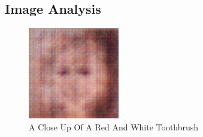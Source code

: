 \documentclass{article}%
\begin{document}
%
\subsection{Image Analysis}%
\label{subsec:ImageAnalysis}%


\begin{figure}[h!]%
\centering%
\includegraphics[width=150px]{500_fake_images/samples_5_114.png}%
\caption{A Close Up Of A Red And White Toothbrush}%
\end{figure}

%
\end{document}
